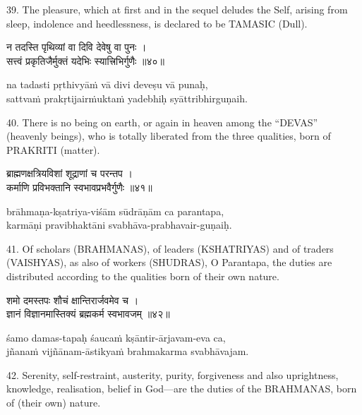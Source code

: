 39. The pleasure, which at first and in the sequel deludes the Self, arising
from sleep, indolence and heedlessness, is declared to be TAMASIC (Dull).

\begin{gitaverse}
न तदस्ति पृथिव्यां वा दिवि देवेषु वा पुनः । \\
सत्त्वं प्रकृतिजैर्मुक्तं यदेभिः स्यात्त्रिभिर्गुणैः ॥४०॥
\end{gitaverse}

\begin{transliteration}
na tadasti pṛthivyāṁ vā divi deveṣu vā punaḥ, \\
sattvaṁ prakṛtijairṁuktaṁ yadebhiḥ syāttribhirguṇaih.
\end{transliteration}

40. There is no being on earth, or again in heaven among the ``DEVAS''
(heavenly beings), who is totally liberated from the three qualities, born of
PRAKRITI (matter).

\begin{gitaverse}
ब्राह्मणक्षत्रियविशां शूद्राणां च परन्तप । \\
कर्माणि प्रविभक्तानि स्वभावप्रभवैर्गुणैः ॥४१॥
\end{gitaverse}

\begin{transliteration}
brāhmaṇa-kṣatriya-viśām sūdrāṇām ca parantapa, \\
karmāṇi pravibhaktāni svabhāva-prabhavair-guṇaiḥ.
\end{transliteration}

41. Of scholars (BRAHMANAS), of leaders (KSHATRIYAS) and of traders (VAISHYAS),
as also of workers (SHUDRAS), O Parantapa, the duties are distributed according
to the qualities born of their own nature.

\begin{gitaverse}
शमो दमस्तपः शौचं क्षान्तिरार्जवमेव च । \\
ज्ञानं विज्ञानमास्तिक्यं ब्रह्मकर्म स्वभावजम् ॥४२॥
\end{gitaverse}

\begin{transliteration}
śamo damas-tapaḥ śaucaṁ kṣāntir-ārjavam-eva ca, \\
jñanaṁ vijñānam-āstikyaṁ brahmakarma svabhāvajam.
\end{transliteration}

42. Serenity, self-restraint, austerity, purity, forgiveness and also
uprightness, knowledge, realisation, belief in God---are the duties of the
BRAHMANAS, born of (their own) nature.

